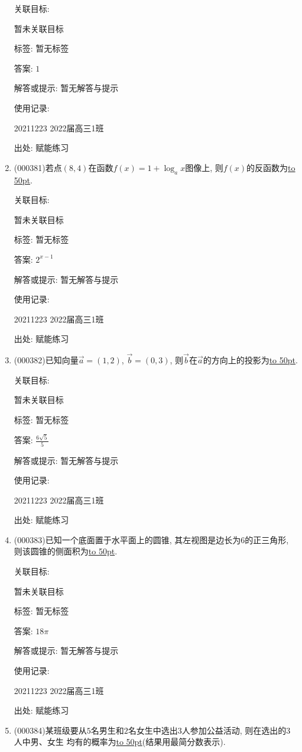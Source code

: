 \documentclass[10pt,a4paper]{article}
\newcommand{\blank}[1]{\underline{\hbox to #1pt{}}}
\begin{document}
\begin{enumerate}[1.]
关联目标:

暂未关联目标



标签: 暂无标签

答案: $1$

解答或提示: 暂无解答与提示

使用记录:

20211223	2022届高三1班	


出处: 赋能练习
\item { (000381)}若点$(8,4)$在函数$f(x)=1+\log_a x$图像上, 则$f(x)$的反函数为\blank{50}.


关联目标:

暂未关联目标



标签: 暂无标签

答案: $2^{x-1}$

解答或提示: 暂无解答与提示

使用记录:

20211223	2022届高三1班	


出处: 赋能练习
\item { (000382)}已知向量$\overrightarrow{a}=(1,2)$, $\overrightarrow{b}=(0,3)$, 则$\overrightarrow{b}$在$\overrightarrow{a}$的方向上的投影为\blank{50}.


关联目标:

暂未关联目标



标签: 暂无标签

答案: $\frac{6\sqrt 5}5$

解答或提示: 暂无解答与提示

使用记录:

20211223	2022届高三1班	


出处: 赋能练习
\item { (000383)}已知一个底面置于水平面上的圆锥, 其左视图是边长为6的正三角形, 则该圆锥的侧面积为\blank{50}.


关联目标:

暂未关联目标



标签: 暂无标签

答案: $18\pi$

解答或提示: 暂无解答与提示

使用记录:

20211223	2022届高三1班	


出处: 赋能练习
\item { (000384)}某班级要从$5$名男生和$2$名女生中选出$3$人参加公益活动, 则在选出的$3$人中男、女生
均有的概率为\blank{50}(结果用最简分数表示).



\end{enumerate}
\end{document}
